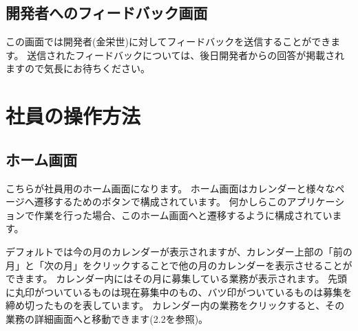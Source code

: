 \documentclass[11pt, a4paper]{jarticle}
\begin{document}
	\subsection{開発者へのフィードバック画面}
		\begin{figure}[htbp]
			\centering
		\end{figure}
		この画面では開発者(金栄世)に対してフィードバックを送信することができます。
		送信されたフィードバックについては、後日開発者からの回答が掲載されますので気長にお待ちください。


\section{社員の操作方法}
	\subsection{ホーム画面}
		\begin{figure}[htbp]
			\centering
		\end{figure}
		こちらが社員用のホーム画面になります。
		ホーム画面はカレンダーと様々なページへ遷移するためのボタンで構成されています。
		何かしらこのアプリケーションで作業を行った場合、このホーム画面へと遷移するように構成されています。
		\par

		デフォルトでは今の月のカレンダーが表示されますが、カレンダー上部の「前の月」と「次の月」をクリックすることで他の月のカレンダーを表示させることができます。
		カレンダー内にはその月に募集している業務が表示されます。
		先頭に丸印がついているものは現在募集中のもの、バツ印がついているものは募集を締め切ったものを表しています。
		カレンダー内の業務をクリックすると、その業務の詳細画面へと移動できます(2.2を参照)。
		\par
\end{document}
